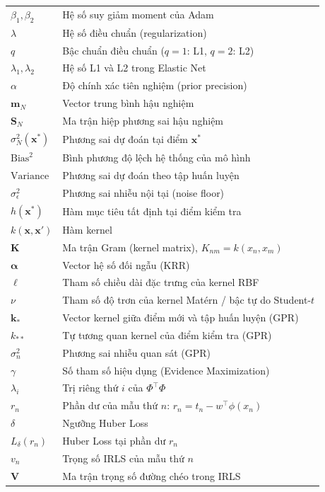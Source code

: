 \documentclass[oneside]{styles/hcmus-report}
\begin{document}
\begin{longtable}{p{} p{}}
$\beta_1, \beta_2$ & Hệ số suy giảm moment của Adam \\
$\lambda$ & Hệ số điều chuẩn (regularization) \\
$q$ & Bậc chuẩn điều chuẩn ($q=1$: L1, $q=2$: L2) \\
$\lambda_1, \lambda_2$ & Hệ số L1 và L2 trong Elastic Net \\
$\alpha$ & Độ chính xác tiên nghiệm (prior precision) \\
$\mathbf{m}_N$ & Vector trung bình hậu nghiệm \\
$\mathbf{S}_N$ & Ma trận hiệp phương sai hậu nghiệm \\
$\sigma_N^2(\mathbf{x}^*)$ & Phương sai dự đoán tại điểm $\mathbf{x}^*$ \\
$\text{Bias}^2$ & Bình phương độ lệch hệ thống của mô hình \\
$\text{Variance}$ & Phương sai dự đoán theo tập huấn luyện \\
$\sigma_\epsilon^2$ & Phương sai nhiễu nội tại (noise floor) \\
$h(\mathbf{x}^*)$ & Hàm mục tiêu tất định tại điểm kiểm tra \\
$k(\mathbf{x}, \mathbf{x}')$ & Hàm kernel \\
$\mathbf{K}$ & Ma trận Gram (kernel matrix), $K_{nm} = k(x_n, x_m)$ \\
$\boldsymbol{\alpha}$ & Vector hệ số đối ngẫu (KRR) \\
$\ell$ & Tham số chiều dài đặc trưng của kernel RBF \\
$\nu$ & Tham số độ trơn của kernel Matérn / bậc tự do Student-$t$ \\
$\mathbf{k}_*$ & Vector kernel giữa điểm mới và tập huấn luyện (GPR) \\
$k_{**}$ & Tự tương quan kernel của điểm kiểm tra (GPR) \\
$\sigma_n^2$ & Phương sai nhiễu quan sát (GPR) \\
$\gamma$ & Số tham số hiệu dụng (Evidence Maximization) \\
$\lambda_i$ & Trị riêng thứ $i$ của $\Phi^\top\Phi$ \\
$r_n$ & Phần dư của mẫu thứ $n$: $r_n = t_n - w^\top\phi(x_n)$ \\
$\delta$ & Ngưỡng Huber Loss \\
$L_\delta(r_n)$ & Huber Loss tại phần dư $r_n$ \\
$v_n$ & Trọng số IRLS của mẫu thứ $n$ \\
$\mathbf{V}$ & Ma trận trọng số đường chéo trong IRLS \\

\end{longtable}
\end{document}
